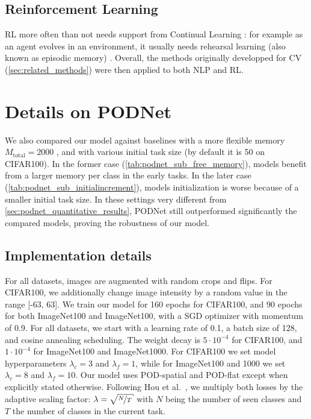 \subsection{Reinforcement Learning}
\label{sec:related_rl}


\ac{RL} \citep{sutton1998rl} more often than not needs support from Continual
Learning \citep{khetarpal2020continualrl}: for example as an agent evolves in an environment, it
usually needs rehearsal learning (also known as episodic memory) \citep{mnih2013atarirl}. Overall,
the methods originally developped for \ac{CV} (\autoref{sec:related_methods}) were then applied to
both \ac{NLP} and \ac{RL}.


\section{Details on PODNet}
\label{sec:appendix_podnet}

We also compared our model against baselines with a more flexible memory $M_{\text{total}} = 2000$
\citep{rebuffi2017icarl,wu2019bias_correction}, and with various initial task size (by default it is
50 on CIFAR100). In the former case (\autoref{tab:podnet_sub_free_memory}), models benefit from a
larger memory per class in the early tasks. In the later case
(\autoref{tab:podnet_sub_initialincrement}), models initialization is worse because of a smaller
initial task size. In these settings very different from \autoref{sec:podnet_quantitative_results},
\ac{PODNet} still outperformed significantly the compared models, proving the robustness of our
model.




\subsection{Implementation details}

For all datasets, images are augmented with random crops and flips. For CIFAR100, we additionally
change image intensity by a random value in the range [-63, 63].
%
We train our model for 160 epochs for CIFAR100, and 90 epochs for both ImageNet100 and ImageNet100,
with a SGD optimizer with momentum of 0.9. For all datasets, we start with a learning rate of 0.1, a
batch size of 128, and cosine annealing scheduling.
%
The weight decay is $5\cdot 10^{-4}$ for CIFAR100, and $1\cdot 10^{-4}$ for ImageNet100 and
ImageNet1000. For CIFAR100 we set model hyperparameters $\lambda_c = 3$ and $\lambda_f=1$, while for
ImageNet100 and 1000 we set $\lambda_c = 8$ and $\lambda_f =10$. Our model uses POD-spatial and
POD-flat except when explicitly stated otherwise. Following Hou et al.~\cite{hou2019ucir}, we
multiply both losses by the adaptive scaling factor: $\lambda=\sqrt{\nicefrac{N}{T}}$ with $N$ being
the number of seen classes and $T$ the number of classes in the current task.

